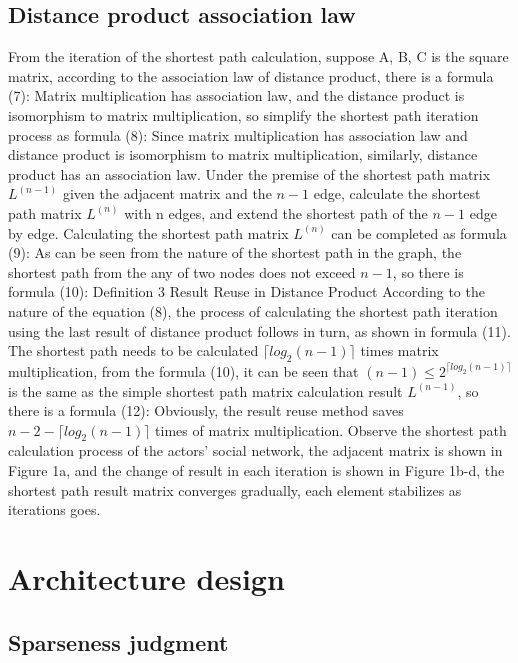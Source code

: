 \documentclass[review]{cvpr}
\begin{document}
\subsection{Distance product association law}

From the iteration of the shortest path calculation, suppose A, B, C is the square matrix, according to the association law of distance product, there is a formula (7):
Matrix multiplication has association law, and the distance product is isomorphism to matrix multiplication, so simplify the shortest path iteration process as formula (8):
Since matrix multiplication has association law and distance product is isomorphism to matrix multiplication, similarly, distance product has an association law.
Under the premise of the shortest path matrix $L^{(n-1)}$ given the adjacent matrix and the $n-1$ edge, calculate the shortest path matrix $L^{(n)}$ with n edges, and extend the shortest path of the $n-1$ edge by edge.
Calculating the shortest path matrix $L^{(n)}$ can be completed as formula (9):
As can be seen from the nature of the shortest path in the graph, the shortest path from the any of two nodes does not exceed $n-1$, so there is formula (10):
Definition 3 Result Reuse in Distance Product According to the nature of the equation (8), the process of calculating the shortest path iteration using the last result of distance product follows in turn, as shown in formula (11).
The shortest path needs to be calculated $\lceil{log_2(n-1)}\rceil$ times matrix multiplication, from the formula (10), it can be seen that $(n-1)\leq2^{\lceil{log_2(n-1)}\rceil}$ is the same as the simple shortest path matrix calculation result $L^{(n-1)}$, so there is a formula (12):
Obviously, the result reuse method saves $n-2-\lceil{log_2(n-1)}\rceil$ times of matrix multiplication.
Observe the shortest path calculation process of the actors' social network, the adjacent matrix is shown in Figure 1a, and the change of result in each iteration is shown in Figure 1b-d, the shortest path result matrix converges gradually, each element stabilizes as iterations goes.

\section{Architecture design}

\subsection{Sparseness judgment}
\end{document}
